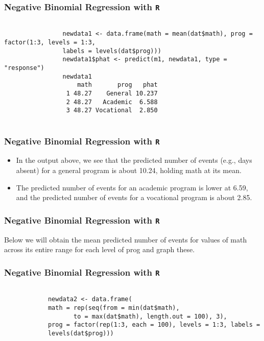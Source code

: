\documentclass[00-GLMregslides.tex]{subfiles}
\begin{document}
	\begin{frame}[fragile]
		\frametitle{Negative Binomial Regression with \texttt{R} }
		\Large
		
		\begin{framed}
			\begin{verbatim}
			
				newdata1 <- data.frame(math = mean(dat$math), prog = factor(1:3, levels = 1:3, 
				labels = levels(dat$prog)))
				newdata1$phat <- predict(m1, newdata1, type = "response")
				newdata1
				    math       prog   phat
				 1 48.27    General 10.237
				 2 48.27   Academic  6.588
				 3 48.27 Vocational  2.850
			
			\end{verbatim}	
		\end{framed}
		
		
	\end{frame}
\begin{frame}[fragile]
	\frametitle{Negative Binomial Regression with \texttt{R} }
	\Large
	
\begin{itemize}
\item In the output above, we see that the predicted number of events (e.g., days absent) for a general program is about 
10.24, holding math at its mean. 
\item The predicted number of events for an academic program is lower at 6.59, and the predicted number of events for a vocational program is about 2.85.
\end{itemize}
\end{frame}
	\begin{frame}[fragile]
		\frametitle{Negative Binomial Regression with \texttt{R} }
		\Large	
	Below we will obtain the mean predicted number of events for values of math across its entire range for each level of prog and graph these.
	\end{frame}
		\begin{frame}[fragile]
		\frametitle{Negative Binomial Regression with \texttt{R} }
		\Large
		
		\begin{framed}
		\begin{verbatim}
		
			newdata2 <- data.frame(
			math = rep(seq(from = min(dat$math), 
			       to = max(dat$math), length.out = 100), 3),
			prog = factor(rep(1:3, each = 100), levels = 1:3, labels =
			levels(dat$prog)))
		\end{verbatim}	
		\end{framed}
		
		
		\end{frame}
\end{document}
